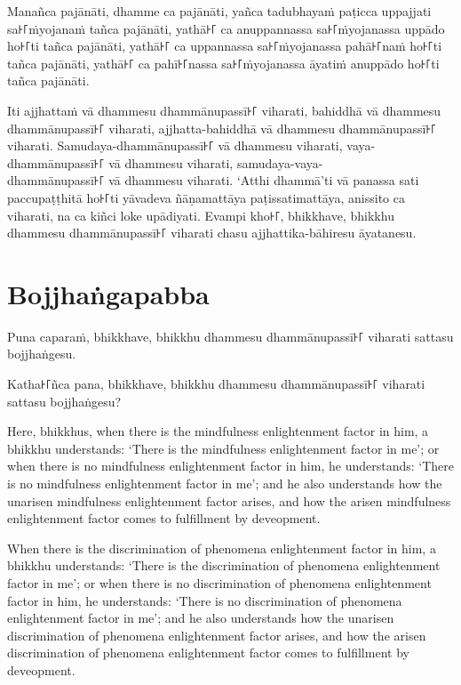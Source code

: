 Manañca pajānāti,
dhamme ca pajānāti,
yañca tadubhayaṁ paṭicca uppajjati sa꜔꜒ṁyojanaṁ tañca pajānāti,
yathā꜔꜒ ca anuppannassa sa꜔꜒ṁyojanassa uppādo ho꜔꜒ti tañca pajānāti,
yathā꜔꜒ ca uppannassa sa꜔꜒ṁyojanassa pahā꜔꜒naṁ ho꜔꜒ti tañca pajānāti,
yathā꜔꜒ ca pahī꜔꜒nassa sa꜔꜒ṁyojanassa āyatiṁ anuppādo ho꜔꜒ti tañca pajānāti.

Iti ajjhattaṁ vā dhammesu dhammānupassī꜔꜒ viharati,
bahiddhā vā dhammesu dhammānupassī꜔꜒ viharati,
ajjhatta-bahiddhā vā dhammesu dhammānupassī꜔꜒ viharati.
Samudaya-dhammānupassī꜔꜒ vā dhammesu viharati,
vaya-dhammānupassī꜔꜒ vā dhammesu viharati,
samudaya-vaya-\\ dhammānupassī꜔꜒ vā dhammesu viharati.
‘Atthi dhammā’ti vā panassa sati paccupaṭṭhitā ho꜔꜒ti
yāvadeva ñāṇamattāya paṭissatimattāya, anissito ca viharati,
na ca kiñci loke upādiyati. Evampi kho꜔꜒, bhikkhave, bhikkhu
dhammesu dhammānupassī꜔꜒ viharati chasu ajjhattika-bāhiresu āyatanesu.


\section*{Bojjhaṅgapabba}

Puna caparaṁ, bhikkhave, bhikkhu dhammesu dhammānupassī꜔꜒ viharati sattasu
bojjhaṅgesu.

Katha꜔꜒ñca pana, bhikkhave, bhikkhu dhammesu dhammānupassī꜔꜒ viharati sattasu
bojjhaṅgesu?

\englishPage

Here, bhikkhus, when there is the mindfulness enlightenment factor in him, a
bhikkhu understands: `There is the mindfulness enlightenment factor in me'; or
when there is no mindfulness enlightenment factor in him, he understands: `There
is no mindfulness enlightenment factor in me'; and he also understands how the
unarisen mindfulness enlightenment factor arises, and how the arisen mindfulness
enlightenment factor comes to fulfillment by deveopment.

When there is the discrimination of phenomena enlightenment factor in him, a
bhikkhu understands: `There is the discrimination of phenomena enlightenment
factor in me'; or when there is no discrimination of phenomena enlightenment
factor in him, he understands: `There is no discrimination of phenomena
enlightenment factor in me'; and he also understands how the unarisen
discrimination of phenomena enlightenment factor arises, and how the arisen
discrimination of phenomena enlightenment factor comes to fulfillment by
deveopment.

